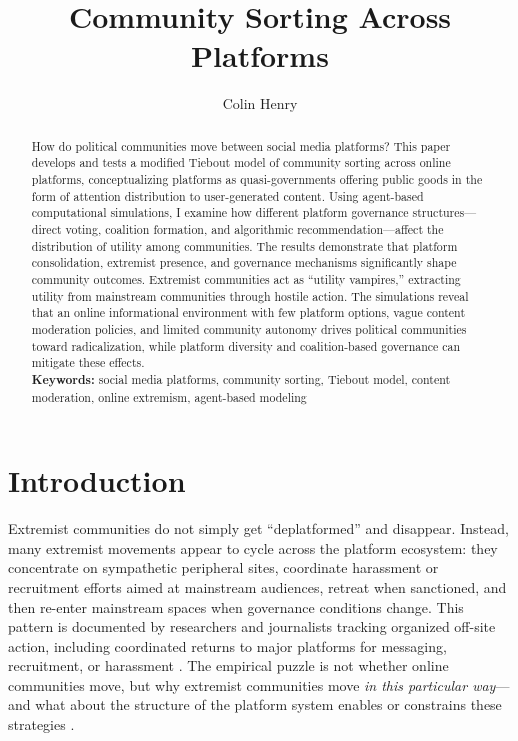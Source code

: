 \documentclass[12pt]{article}
\title{Community Sorting Across Platforms}
\author[1]{Colin Henry}
\affil[1]{Department of Political Science, University of Zurich, Switzerland}
\date{}
\begin{document}
\maketitle

\begin{abstract}
How do political communities move between social media platforms? This paper develops and tests a modified Tiebout model of community sorting across online platforms, conceptualizing platforms as quasi-governments offering public goods in the form of attention distribution to user-generated content. Using agent-based computational simulations, I examine how different platform governance structures---direct voting, coalition formation, and algorithmic recommendation---affect the distribution of utility among communities. The results demonstrate that platform consolidation, extremist presence, and governance mechanisms significantly shape community outcomes. Extremist communities act as ``utility vampires,'' extracting utility from mainstream communities through hostile action. The simulations reveal that an online informational environment with few platform options, vague content moderation policies, and limited community autonomy drives political communities toward radicalization, while platform diversity and coalition-based governance can mitigate these effects. \\

\textbf{Keywords:} social media platforms, community sorting, Tiebout model, content moderation, online extremism, agent-based modeling
\end{abstract}

\section{Introduction}

Extremist communities do not simply get ``deplatformed'' and disappear. Instead, many extremist movements appear to cycle across the platform ecosystem: they concentrate on sympathetic peripheral sites, coordinate harassment or recruitment efforts aimed at mainstream audiences, retreat when sanctioned, and then re-enter mainstream spaces when governance conditions change. This pattern is documented by researchers and journalists tracking organized off-site action, including coordinated returns to major platforms for messaging, recruitment, or harassment \citep{lavin2020culture, gais2021encrypted}. The empirical puzzle is not whether online communities move, but why extremist communities move \emph{in this particular way}---and what about the structure of the platform system enables or constrains these strategies \citep{dehghan2022politicization}.
\end{document}
